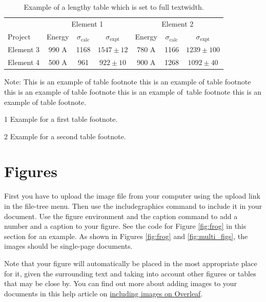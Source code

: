 \documentclass[10pt,a4paper]{article}
\begin{document}
\begin{appendices}
\begin{table}[!ht]
\caption{Example of a lengthy table which is set to full textwidth.\label{tab2}}
\tabcolsep=0pt
\begin{threeparttable}
\begin{tabular*}{\textwidth}{@{\extracolsep{\fill}}lcccccc@{\extracolsep{\fill}}}
\toprule
& \multicolumn{3}{c}{Element 1\tnote{1}} & \multicolumn{3}{c}{Element 2\tnote{2}} \\
\cmidrule(lr){2-4}\cmidrule(lr){5-7}
Project & Energy & $\sigma_{\mathrm{calc}}$ & $\sigma_{\mathrm{expt}}$ & Energy & $\sigma_{\mathrm{calc}}$ & $\sigma_{\mathrm{expt}}$ \\
\midrule
Element 3 & 990 A & 1168 & $1547\pm12$ & 780 A & 1166 & $1239\pm100$ \\
Element 4 & 500 A & 961 & $922\pm10$ & 900 A & 1268 & $1092\pm40$ \\
\bottomrule
\end{tabular*}
\begin{tablenotes}
\item Note: This is an example of table footnote this is an example of table footnote this is an example of table footnote this is an example of~table footnote this is an example of table footnote.
\item[1] Example for a first table footnote.
\item[2] Example for a second table footnote.
\end{tablenotes}
\end{threeparttable}
\end{table}


\section{Figures}\label{sec6}

First you have to upload the image file from your computer using the upload link in the file-tree menu. Then use the includegraphics command to include it in your document. Use the figure environment and the caption command to add a number and a caption to your figure. See the code for Figure \ref{fig:frog} in this section for an example. As shown in Figures \ref{fig:frog} and \ref{fig:multi_figs}, the images should be single-page documents. 

Note that your figure will automatically be placed in the most appropriate place for it, given the surrounding text and taking into account other figures or tables that may be close by. You can find out more about adding images to your documents in this help article on \href{https://www.overleaf.com/learn/how-to/Including_images_on_Overleaf}{including images on Overleaf}.


\end{appendices}
\end{document}
